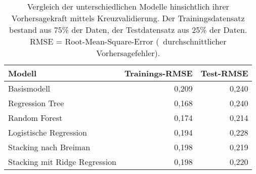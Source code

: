 \begin{table}[H]
    \caption{Vergleich der unterschiedlichen Modelle hinsichtlich ihrer Vorhersagekraft mittels Kreuzvalidierung. Der Trainingsdatensatz bestand aus 75\% der Daten, der Testdatensatz aus 25\% der Daten. RMSE =  Root-Mean-Square-Error (~durchschnittlicher Vorhersagefehler).}
    \centering
    \label{tab:n:Mcomparison}
    \begin{tabular}{l|rr}
        \toprule
        Modell  & Trainings-RMSE & Test-RMSE \\
        \midrule
        Basismodell                     & 0,209     & 0,240 \\ 
        Regression Tree                 & 0,168     & 0,240\\ 
        Random Forest                   & 0,174     & 0,214\\ 
        Logistische Regression          & 0,194     & 0,228\\ 
        Stacking nach Breiman           & 0,198     & 0,219\\ 
        Stacking mit Ridge Regression   & 0,198     & 0,220\\ 
        \bottomrule
    \end{tabular}
\end{table}